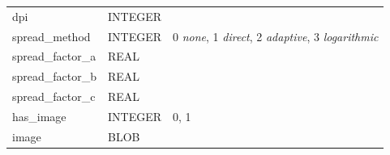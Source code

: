 \documentclass[10pt,letterpaper,titlepage]{article}
\begin{document}
\begin{table}[H]
\begin{tabular}{l l l}
            dpi & INTEGER & \\
            spread\_method & INTEGER & 0 \textit{none}, 1 \textit{direct}, 2 \textit{adaptive}, 3 \textit{logarithmic}\\
            spread\_factor\_a & REAL & \\
            spread\_factor\_b & REAL & \\
            spread\_factor\_c & REAL & \\
            has\_image & INTEGER & 0, 1\\
            image & BLOB & \\
            \hline
        \end{tabular}
    \end{table}
\end{document}
